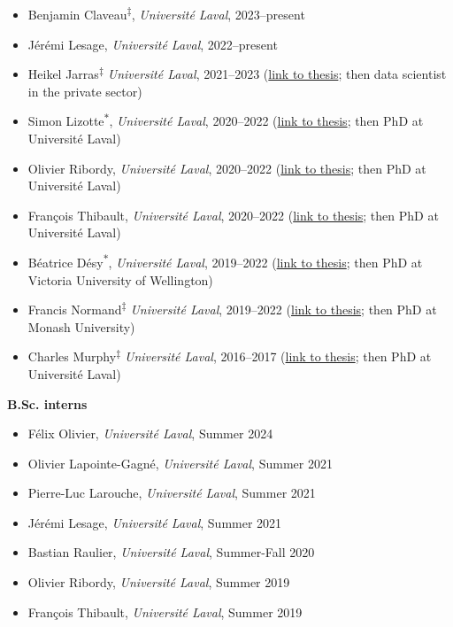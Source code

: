 \documentclass[11pt]{article}
\begin{document}
\begin{itemize}
  \item Benjamin Claveau\textsuperscript{$\ddagger$}, \textit{Universit\'e Laval}, 2023--present
  \item Jérémi Lesage, \textit{Universit\'e Laval}, 2022--present
  \item Heikel Jarras\textsuperscript{$\ddagger$} \textit{Universit\'e Laval}, 2021--2023 {\small (\href{http://hdl.handle.net/20.500.11794/125407}{link to thesis}; then data scientist in the private sector)}
  \item Simon Lizotte\textsuperscript{$\ast$}, \textit{Universit\'e Laval}, 2020--2022 {\small(\href{http://antoineallard.github.io/files/theses/Lizotte.2022.MSc.pdf}{link to thesis}; then PhD at Université Laval)}
  \item Olivier Ribordy, \textit{Universit\'e Laval}, 2020--2022 {\small(\href{http://antoineallard.github.io/files/theses/Ribordy.2022.MSc.pdf}{link to thesis}; then PhD at Université Laval)}
  \item Fran\c{c}ois Thibault, \textit{Universit\'e Laval}, 2020--2022 {\small(\href{http://antoineallard.github.io/files/theses/Thibault.2022.MSc.pdf}{link to thesis}; then PhD at Université Laval)}
  \item B\'eatrice D\'esy\textsuperscript{$\ast$}, \textit{Universit\'e Laval}, 2019--2022 {\small(\href{http://antoineallard.github.io/files/theses/Desy.2022.MSc.pdf}{link to thesis}; then PhD at Victoria University of Wellington)}
  \item Francis Normand\textsuperscript{$\ddagger$} \textit{Universit\'e Laval}, 2019--2022 {\small(\href{http://hdl.handle.net/20.500.11794/73573}{link to thesis}; then PhD at Monash University)}
  \item Charles Murphy\textsuperscript{$\ddagger$} \textit{Universit\'e Laval}, 2016--2017 {\small(\href{http://hdl.handle.net/20.500.11794/30382}{link to thesis}; then PhD at Université Laval)}
\end{itemize}
%
%
%
\textbf{B.Sc. interns}
%
\begin{itemize}
  \item Félix Olivier, \textit{Université Laval}, Summer 2024
  \item Olivier Lapointe-Gagn\'e, \textit{Universit\'e Laval}, Summer 2021
  \item Pierre-Luc Larouche, \textit{Universit\'e Laval}, Summer 2021
  \item Jérémi Lesage, \textit{Universit\'e Laval}, Summer 2021
  \item Bastian Raulier, \textit{Universit\'e Laval}, Summer-Fall 2020
  \item Olivier Ribordy, \textit{Universit\'e Laval}, Summer 2019
  \item Fran\c{c}ois Thibault, \textit{Universit\'e Laval}, Summer 2019
\end{itemize}
\end{document}
